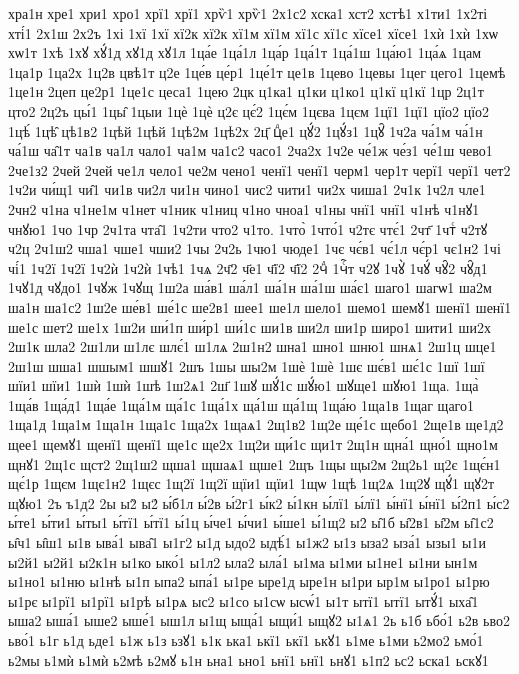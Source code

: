 {хра1н
хре1
хри1
хро1
хрї1
хрї1
хрѷ1
хрѷ1
2х1с2
хска1
хст2
хстѣ1
х1ти1
1х2ті
хті́1
2х1ш
2х2ъ
1хі
1хї
1хї
хї2к
хї2к
хї1м
хї1м
хї1с
хї1с
хїсе1
хїсе1
1хѝ
1хѝ
1хѡ
хѡ1т
1хѣ
1хꙋ
хꙋ́1д
хꙋ1д
хꙋ1л
1ца́е
1ца́1л
1ца́р
1ца́1т
1ца́1ш
1ца́ю1
1ца́ѧ
1цам
1ца1р
1ца2х
1ц2в
цвѣ1т
ц2е
1це́в
це́р1
1це́1т
це1в
1цево
1цевы
1цег
цего1
1цемѣ
1це1н
2цеп
це2р1
1це1с
цеса1
1цею
2цк
ц1ка1
ц1ки
ц1ко1
ц1кї
ц1кї
1цр
2ц1т
цто2
2ц2ъ
цы́1
1цы̑
1цыи
1цѐ
1цѐ
ц2є
цє́2
1цє́м
1цєва
1цєм
1цї1
1цї1
цїо2
цїо2
1цѣ́
1цѣ̑
цѣ1в2
1цѣй
1цѣй
1цѣ2м
1цѣ2х
2ц҃
цⷣе1
цꙋ́2
1цꙋ́з1
1цꙋ̑
1ч2а
ча́1м
ча́1н
ча́1ш
ча̑1т
ча1в
ча1л
чало1
ча1м
ча1с2
часо1
2ча2х
1ч2е
че́1ж
че́з1
че́1ш
чево1
2че1з2
2чей
2чей
че1л
чело1
че2м
чено1
ченї1
ченї1
черм1
чер1т
черї1
черї1
чет2
1ч2и
чи́щ1
чи̑1
чи1в
чи2л
чи1н
чино1
чис2
чити1
чи2х
чиша1
2ч1к
1ч2л
чле1
2чн2
ч1на
ч1не1м
ч1нет
ч1ник
ч1ниц
ч1но
чноа1
ч1ны
чнї1
чнї1
ч1нѣ
ч1нꙋ1
чнꙋю1
1чо
1чр
2ч1та
чта̑1
1ч2ти
что2
ч1то.
1что̀
1что́1
ч2тє
чтє́1
2чт҃
1чтⷭ
ч2тꙋ
ч2ц
2ч1ш2
чша1
чше1
чши2
1чы
2ч2ь
1чю1
чюде1
1чє
чє́в1
чє́1л
чє́р1
чє1н2
1чі
чі́1
1ч2ї
1ч2ї
1ч2ѝ
1ч2ѝ
1чѣ1
1чѧ
2ч҃2
ч҃е1
ч҃ї2
ч҃ї2
2чⷣ
1чⷭ҇т
ч2ꙋ
1чꙋ̀
1чꙋ́
чꙋ̑2
чꙋ̑д1
1чꙋ1д
чꙋдо1
1чꙋж
1чꙋщ
1ш2а
ша́в1
ша́л1
ша́1н
ша́1ш
ша́є1
шаго1
шагѡ1
ша2м
ша1н
ша1с2
1ш2е
ше́в1
ше́1с
ше2в1
шее1
ше1л
шело1
шемо1
шемꙋ1
шенї1
шенї1
ше1с
шет2
ше1х
1ш2и
ши́1п
ши́р1
ши́1с
ши1в
ши2л
ши1р
широ1
шити1
ши2х
2ш1к
шла2
2ш1ли
ш1лє
шлє́1
ш1лѧ
2ш1н2
шна1
шно1
шню1
шнѧ1
2ш1ц
шце1
2ш1ш
шша1
шшым1
шшꙋ1
2шъ
1шы
шы2м
1шѐ
1шѐ
1шє
шє́в1
шє́1с
1шї
1шї
шїи1
шїи1
1шѝ
1шѝ
1шѣ
1ш2ѧ1
2ш҃
1шꙋ
шꙋ́1с
шꙋ́ю1
шꙋще1
шꙋю1
1ща.
1ща̀
1ща́в
1ща́д1
1ща́е
1ща́1м
ща́1с
1ща́1х
ща́1ш
ща́1щ
1ща́ю
1ща1в
1щаг
щаго1
1ща1д
1ща1м
1ща1н
1ща1с
1ща2х
1щаѧ1
2щ1в2
1щ2е
ще́1с
щебо1
2ще1в
ще1д2
щее1
щемꙋ1
щенї1
щенї1
ще1с
ще2х
1щ2и
щи́1с
щи1т
2щ1н
щна́1
щно́1
щно1м
щнꙋ1
2щ1с
щст2
2щ1ш2
щша1
щшаѧ1
щше1
2щъ
1щы
щы2м
2щ2ь1
щ2є
1щє́н1
щє́1р
1щєм
1щє1н2
1щєс
1щ2ї
1щ2ї
щїи1
щїи1
1щѡ
1щѣ
1щ2ѧ
1щ2ꙋ
щꙋ́1
щꙋ2т
щꙋю1
2ъ
ъ1д2
2ы
ы2̀
ы2́
ы́б1л
ы́2в
ы́2г1
ы́к2
ы́1кн
ы́лї1
ы́лї1
ы́нї1
ы́нї1
ы́2п1
ы́с2
ы́те1
ы́ти1
ы́ты1
ы́тї1
ы́тї1
ы́1ц
ы́че1
ы́чи1
ы́ше1
ы́1щ2
ы2̑
ы̑1б
ы̑2в1
ы̑2м
ы̑1с2
ы̑ч1
ы̑ш1
ы1в
ыва́1
ыва̑1
ы1г2
ы1д
ыдо2
ыдѣ́1
ы1ж2
ы1з
ыза2
ыза́1
ызы1
ы1и
ы2й1
ы2й1
ы2к1н
ы1ко
ыко́1
ы1л2
ыла2
ыла́1
ы1ма
ы1ми
ы1не1
ы1ни
ын1м
ы1но1
ы1ню
ы1нѣ
ы1п
ыпа2
ыпа́1
ы1ре
ыре1д
ыре1н
ы1ри
ыр1м
ы1ро1
ы1рю
ы1рє
ы1рї1
ы1рї1
ы1рѣ
ы1рѧ
ыс2
ы1со
ы1сѡ
ысѡ́1
ы1т
ытї1
ытї1
ытꙋ́1
ыха̑1
ыша2
ыша́1
ыше2
ыше́1
ыш1л
ы1щ
ыща́1
ыщи́1
ыщꙋ2
ы1ѧ1
2ь
ь1б
ьбо́1
ь2в
ьво2
ьво́1
ь1г
ь1д
ьде1
ь1ж
ь1з
ьзꙋ1
ь1к
ька1
ькї1
ькї1
ькꙋ1
ь1ме
ь1ми
ь2мо2
ьмо́1
ь2мы
ь1мѝ
ь1мѝ
ь2мѣ
ь2мꙋ
ь1н
ьна1
ьно1
ьнї1
ьнї1
ьнꙋ1
ь1п2
ьс2
ьска1
ьскꙋ1
}
